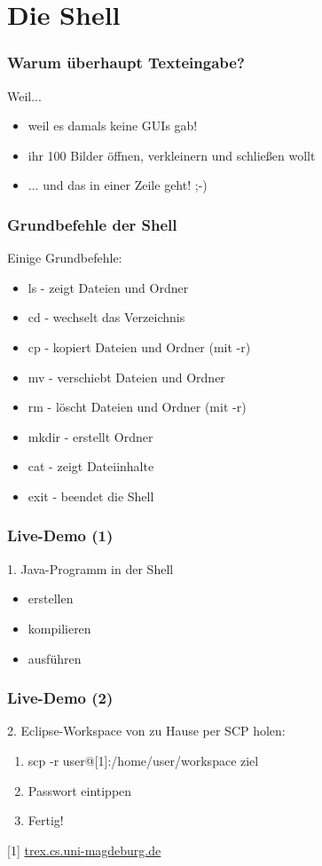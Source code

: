 \documentclass[12pt]{beamer}
\begin{document}
\section{Die Shell}

\begin{frame}
	\frametitle{Warum überhaupt Texteingabe?}

	Weil...
	\begin{itemize}
		\pause
		\item weil es damals keine GUIs gab!
		\pause
		\item ihr 100 Bilder öffnen, verkleinern und schließen wollt
		\pause
		\item ... und das in einer Zeile geht! ;-)
	\end{itemize}
\end{frame}

\begin{frame}

	\frametitle{Grundbefehle der Shell}
	
	Einige Grundbefehle:
	\begin{itemize}
		\pause
		\item	ls - zeigt Dateien und Ordner
		\pause
		\item cd - wechselt das Verzeichnis
		\pause
		\item	cp - kopiert Dateien und Ordner (mit -r)
		\pause
		\item	mv - verschiebt Dateien und Ordner
		\pause
		\item rm - löscht Dateien und Ordner (mit -r)
		\pause
		\item mkdir - erstellt Ordner
		\pause
		\item cat - zeigt Dateiinhalte
		\pause
		\item exit - beendet die Shell
	\end{itemize}
\end{frame}

\begin{frame}

	\frametitle{Live-Demo (1)}

	1. Java-Programm in der Shell
	\begin{itemize}
		\item erstellen
		\item kompilieren
		\item ausführen
	\end{itemize}

\end{frame}

\begin{frame}
	\frametitle{Live-Demo (2)}

	2. Eclipse-Workspace von zu Hause per SCP holen:
	\begin{enumerate}
		\item scp -r \textdollar{}user@[1]:/home/\textdollar{}user/workspace \textdollar{}ziel
		\item	Passwort eintippen
		\item	Fertig!
	\end{enumerate}

	\scriptsize [1] \url{trex.cs.uni-magdeburg.de}
\end{frame}
\end{document}

